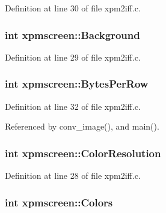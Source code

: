 Definition at line 30 of file xpm2iff.\+c.

\hypertarget{structxpmscreen_a51bea1e3bc784d2588ce5c6104927328}{
\subsubsection[{Background}]{\setlength{\rightskip}{0pt plus 5cm}int xpmscreen\+::\+Background}}\label{structxpmscreen_a51bea1e3bc784d2588ce5c6104927328}


Definition at line 29 of file xpm2iff.\+c.

\hypertarget{structxpmscreen_a4ea7684c8ea4ef25e996f8d002555c7e}{
\subsubsection[{Bytes\+Per\+Row}]{\setlength{\rightskip}{0pt plus 5cm}int xpmscreen\+::\+Bytes\+Per\+Row}}\label{structxpmscreen_a4ea7684c8ea4ef25e996f8d002555c7e}


Definition at line 32 of file xpm2iff.\+c.



Referenced by conv\+\_\+image(), and main().

\hypertarget{structxpmscreen_a3c640f4696b245212bcba9d5e3e01f08}{
\subsubsection[{Color\+Resolution}]{\setlength{\rightskip}{0pt plus 5cm}int xpmscreen\+::\+Color\+Resolution}}\label{structxpmscreen_a3c640f4696b245212bcba9d5e3e01f08}


Definition at line 28 of file xpm2iff.\+c.

\hypertarget{structxpmscreen_a247650539e8235f8ca9c88fdfc7175dc}{
\subsubsection[{Colors}]{\setlength{\rightskip}{0pt plus 5cm}int xpmscreen\+::\+Colors}}\label{structxpmscreen_a247650539e8235f8ca9c88fdfc7175dc}


